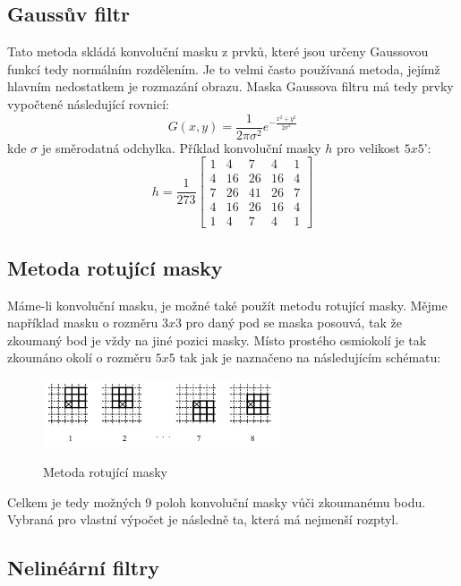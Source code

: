 \documentclass{thesis}%
\begin{document}
\subsection{Gaussův filtr}\label{gauss}
Tato metoda skládá konvoluční masku z prvků, které jsou určeny Gaussovou funkcí tedy normálním rozdělením. Je to velmi často používaná metoda, jejímž hlavním nedostatkem je rozmazání obrazu. Maska Gaussova filtru má tedy prvky vypočtené následující rovnicí:
 \begin{equation}
 G(x,y) = \frac{1}{2\pi\sigma^2}e^{-\frac{x^2+y^2}{2\sigma^2}}
 \end{equation}
 kde $\sigma$ je směrodatná odchylka. Příklad konvoluční masky $h$ pro velikost $5x5$': 
$$
h = \frac{1}{273}\left[
\begin{matrix}
1&4&7&4&1\\
4&16&26&16&4\\
7&26&41&26&7\\
4&16&26&16&4\\
1&4&7&4&1
\end{matrix}
\right]
$$
\subsection{Metoda rotující masky}
Máme-li konvoluční masku, je možné také použít metodu rotující masky. Mějme například masku o rozměru $3x3$ pro daný pod se maska posouvá, tak že zkoumaný bod je vždy na jiné pozici masky. Místo prostého osmiokolí je tak zkoumáno okolí o rozměru $5x5$ tak jak je naznačeno na následujícím schématu:
   \begin{figure}[htp!]
  \centering
   \includegraphics[width=7cm]{rotmask.png}\\ 
    \caption[Metoda rotující masky]{Metoda rotující masky}
\end{figure}
Celkem je tedy možných 9 poloh konvoluční masky vůči zkoumanému bodu. Vybraná pro vlastní výpočet je následně ta, která má nejmenší rozptyl.
\subsection{Nelinéární filtry}
\end{document}
